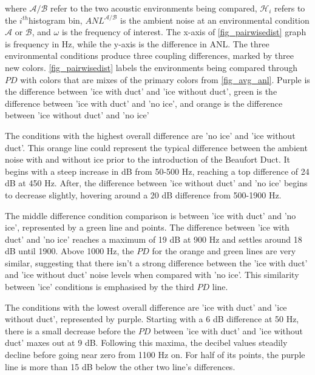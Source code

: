 where $\mathcal{A/B}$ refer to the two acoustic environments being compared, $\mathcal{H}_{i}$ refers to the $i^{th}$histogram bin, $ANL^{\mathcal{A/B}}$ is the ambient noise at an environmental condition $\mathcal{A}$ or $\mathcal{B}$, and $\omega$ is the frequency of interest. The x-axis of \autoref{fig_pairwisedist} graph is frequency in Hz, while the y-axis is the difference in ANL. The three environmental conditions produce three coupling differences, marked by three new colors. \autoref{fig_pairwisedist} labels the environments being compared through $PD$ with colors that are mixes of the primary colors from \autoref{fig_avg_anl}. Purple is the difference between 'ice with duct' and 'ice without duct', green is the difference between 'ice with duct' and 'no ice', and orange is the difference between 'ice without duct' and 'no ice'

The conditions with the highest overall difference are 'no ice' and 'ice without duct'. This orange line could represent the typical difference between the ambient noise with and without ice prior to the introduction of the Beaufort Duct. It begins with a steep increase in dB from 50-500 Hz, reaching a top difference of 24 dB at 450 Hz. After, the difference between 'ice without duct' and 'no ice' begins to decrease slightly, hovering around a 20 dB difference from 500-1900 Hz.

The middle difference condition comparison is between 'ice with duct' and 'no ice', represented by a green line and points. The difference between 'ice with duct' and 'no ice' reaches a maximum of 19 dB at 900 Hz and settles around 18 dB until 1900. Above 1000 Hz, the $PD$ for the orange and green lines are very similar, suggesting that there isn't a strong difference between the 'ice with duct' and 'ice without duct' noise levels when compared with 'no ice'. This  similarity between 'ice' conditions is emphasised by the third $PD$ line.

The conditions with the lowest overall difference are 'ice with duct' and 'ice without duct', represented by purple. Starting with a 6 dB difference at 50 Hz, there is a small decrease before the $PD$ between 'ice with duct' and 'ice without duct' maxes out at 9 dB. Following this maxima, the decibel values steadily decline before going near zero from 1100 Hz on. For half of its points, the purple line is more than 15 dB below the other two line's differences.  

